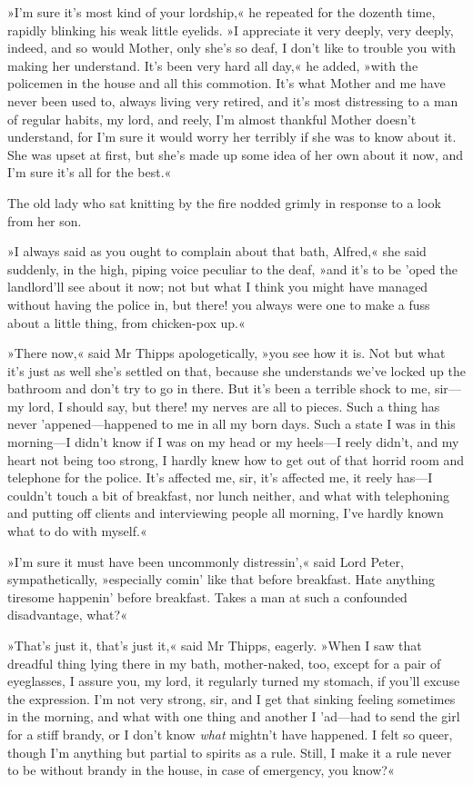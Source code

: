 »I'm sure it's most kind of your lordship,« he repeated for the dozenth time, rapidly blinking his weak little eyelids. »I appreciate it very deeply, very deeply, indeed, and so would Mother, only she's so deaf, I don't like to trouble you with making her understand. It's been very hard all day,« he added, »with the policemen in the house and all this commotion. It's what Mother and me have never been used to, always living very retired, and it's most distressing to a man of regular habits, my lord, and reely, I'm almost thankful Mother doesn't understand, for I'm sure it would worry her terribly if she was to know about it. She was upset at first, but she's made up some idea of her own about it now, and I'm sure it's all for the best.«

The old lady who sat knitting by the fire nodded grimly in response to a look from her son.

»I always said as you ought to complain about that bath, Alfred,« she said suddenly, in the high, piping voice peculiar to the deaf, »and it's to be 'oped the landlord'll see about it now; not but what I think you might have managed without having the police in, but there! you always were one to make a fuss about a little thing, from chicken-pox up.«

»There now,« said Mr Thipps apologetically, »you see how it is. Not but what it's just as well she's settled on that, because she understands we've locked up the bathroom and don't try to go in there. But it's been a terrible shock to me, sir—my lord, I should say, but there! my nerves are all to pieces. Such a thing has never 'appened—happened to me in all my born days. Such a state I was in this morning—I didn't know if I was on my head or my heels—I reely didn't, and my heart not being too strong, I hardly knew how to get out of that horrid room and telephone for the police. It's affected me, sir, it's affected me, it reely has—I couldn't touch a bit of breakfast, nor lunch neither, and what with telephoning and putting off clients and interviewing people all morning, I've hardly known what to do with myself.«

»I'm sure it must have been uncommonly distressin',« said Lord Peter, sympathetically, »especially comin' like that before breakfast. Hate anything tiresome happenin' before breakfast. Takes a man at such a confounded disadvantage, what?«

»That's just it, that's just it,« said Mr Thipps, eagerly. »When I saw that dreadful thing lying there in my bath, mother-naked, too, except for a pair of eyeglasses, I assure you, my lord, it regularly turned my stomach, if you'll excuse the expression. I'm not very strong, sir, and I get that sinking feeling sometimes in the morning, and what with one thing and another I 'ad—had to send the girl for a stiff brandy, or I don't know \textit{what} mightn't have happened. I felt so queer, though I'm anything but partial to spirits as a rule. Still, I make it a rule never to be without brandy in the house, in case of emergency, you know?«


